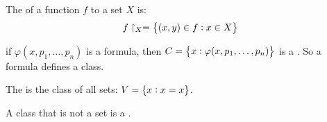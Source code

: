 \begin{definition}
    The  of a function $f$ to a set $X$ is:
    \begin{equation}
        f\restriction_X = \set{(x,y) \in f : x \in X}
    \end{equation}
\end{definition}

\begin{definition}[class]
    if $\varphi(x, p_1, \dots, p_n)$ is a formula, then $C = \set{x: \varphi(x, p_1, \dots, p_n)}$ is a . So a formula defines a class.
\end{definition}

\begin{definition}[universe]
    The  is the class of all sets: $V = \set{x: x = x}$.
\end{definition}

\begin{definition}
    A class that is not a set is a .
\end{definition}